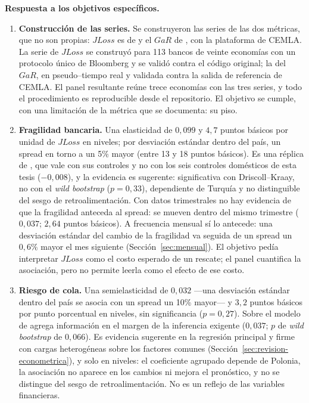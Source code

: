 \textbf{Respuesta a los objetivos específicos.}
\begin{enumerate}
    \item \textbf{Construcción de las series.} Se construyeron las series de las dos métricas, que no son propias: $JLoss$ es de \citet{Chari2024b} y el $GaR$ de \citet{ABG2019b}, con la plataforma de CEMLA. La serie de $JLoss$ se construyó para 113 bancos de veinte economías con un protocolo único de Bloomberg y se validó contra el código original; la del $GaR$, en pseudo--tiempo real y validada contra la salida de referencia de CEMLA. El panel resultante reúne trece economías con las tres series, y todo el procedimiento es reproducible desde el repositorio. El objetivo se cumple, con una limitación de la métrica que se documenta: su piso.
    \item \textbf{Fragilidad bancaria.} Una elasticidad de $0{,}099$ y $4{,}7$ puntos básicos por unidad de $JLoss$ en niveles; por desviación estándar dentro del país, un spread en torno a un 5\% mayor (entre 13 y 18 puntos básicos). Es una réplica de \citet{Chari2024b}, que vale con sus controles y no con los seis controles domésticos de esta tesis ($-0{,}008$), y la evidencia es sugerente: significativa con Driscoll--Kraay, no con el \textit{wild bootstrap} ($p=0{,}33$), dependiente de Turquía y no distinguible del sesgo de retroalimentación. Con datos trimestrales no hay evidencia de que la fragilidad anteceda al spread: se mueven dentro del mismo trimestre ($0{,}037$; $2{,}64$ puntos básicos). A frecuencia mensual sí lo antecede: una desviación estándar del cambio de la fragilidad va seguida de un spread un $0{,}6\%$ mayor el mes siguiente (Sección~\ref{sec:mensual}). El objetivo pedía interpretar $JLoss$ como el costo esperado de un rescate; el panel cuantifica la asociación, pero no permite leerla como el efecto de ese costo.
    \item \textbf{Riesgo de cola.} Una semielasticidad de $0{,}032$ ---una desviación estándar dentro del país se asocia con un spread un 10\% mayor--- y $3{,}2$ puntos básicos por punto porcentual en niveles, sin significancia ($p=0{,}27$). Sobre el modelo de \citet{Chari2024b} agrega información en el margen de la inferencia exigente ($0{,}037$; $p$ de \textit{wild bootstrap} de $0{,}066$). Es evidencia sugerente en la regresión principal y firme con cargas heterogéneas sobre los factores comunes (Sección~\ref{sec:revision-econometrica}), y solo en niveles: el coeficiente agrupado depende de Polonia, la asociación no aparece en los cambios ni mejora el pronóstico, y no se distingue del sesgo de retroalimentación. No es un reflejo de las variables financieras.

\end{enumerate}
